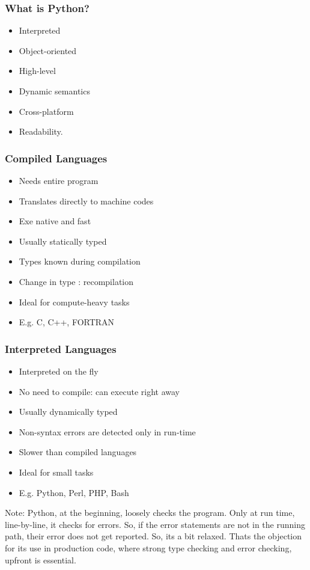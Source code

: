 \begin{frame}[fragile]  \frametitle{What is Python?}
\begin{itemize}
\item Interpreted
\item Object-oriented 
\item High-level
\item Dynamic semantics
\item Cross-platform
\item Readability.
\end{itemize}


\end{frame}


\begin{frame}[fragile]  \frametitle{Compiled Languages}
\begin{itemize}
\item Needs entire program
\item Translates directly to machine codes 
\item Exe native and fast
\item Usually statically typed
\item Types known during compilation
\item Change in type : recompilation
\item Ideal for compute-heavy tasks
\item E.g. C, C++, FORTRAN
\end{itemize}
\end{frame}

\begin{frame}[fragile]  \frametitle{Interpreted Languages}
\begin{itemize}
\item  Interpreted on the fly
\item No need to compile: can execute right away
\item Usually dynamically typed
\item Non-syntax errors are detected only in run-time
\item Slower than compiled languages
\item Ideal for small tasks
\item  E.g. Python, Perl, PHP, Bash
\end{itemize}

Note: Python, at the beginning, loosely checks the program. Only at run time, line-by-line, it checks for errors. So, if the error statements are not in the running path, their error does not get reported. So, its a bit relaxed. Thats the objection for its use in production code, where strong type checking and error checking, upfront is essential.
\end{frame}

